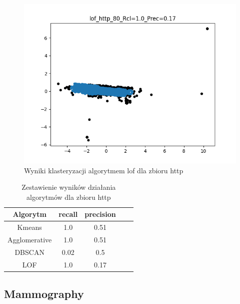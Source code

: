 \documentclass{classrep}
\begin{document}
{{            \begin{figure}[!htbp]
                \centering
                \includegraphics[width=\textwidth]{img/lof_http_80_-115810.png}
                \caption
                {Wyniki klasteryzacji algorytmem lof dla zbioru http}
                \label{fig:http_lof}
            \end{figure}
            \FloatBarrier

            \begin{table}[!htbp]
                \centering
                \begin{tabular}{|c|c|c|c|c|}
                    \hline
                    Algorytm & recall & precision \\ \hline
                    Kmeans &1.0 & 0.51 \\ \hline
                    Agglomerative & 1.0 & 0.51  \\ \hline
                    DBSCAN & 0.02 & 0.5  \\ \hline
                    LOF & 1.0 & 0.17  \\ \hline
                \end{tabular}
                \caption
                {Zestawienie wyników działania algorytmów dla zbioru http}
                \label{tab:http}
            \end{table}
            \FloatBarrier
        }

        \subsection{Mammography} {

}}
\end{document}
